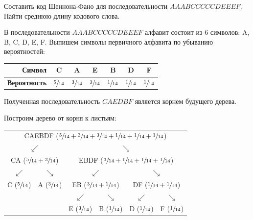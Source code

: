 \begin{example}
    \task%
    Составить код Шеннона-Фано для последовательности $AAABCCCCCDEEEF$. Найти среднюю длину кодового слова.

    \solution%
    В последовательности $AAABCCCCCDEEEF$ алфавит состоит из 6 символов: A, B, C, D, E, F. Выпишем символы первичного алфавита по убыванию вероятностей:
    \begin{table}[H]
        \centering
        \begin{tabular}{|r|c|c|c|c|c|c|}
            \hline
            \textbf{Символ} & C & A & E & B & D & F \\ \hline
            \textbf{Вероятность} & $\sfrac{5}{14}$ & $\sfrac{3}{14}$ & $\sfrac{3}{14}$ & $\sfrac{1}{14}$ & $\sfrac{1}{14}$ & $\sfrac{1}{14}$ \\ \hline
        \end{tabular}
    \end{table}

    Полученная последовательность $CAEDBF$ является корнем будущего дерева.

    Построим дерево от корня к листьям:

    \begin{table}[H]
        \centering
        \begin{tabular}{cccccc}
            \multicolumn{6}{c}{CAEBDF ($\sfrac{5}{14} + \sfrac{3}{14} + \sfrac{3}{14} + \sfrac{1}{14} + \sfrac{1}{14} + \sfrac{1}{14}$)} \\
            \multicolumn{2}{c}{$\swarrow$} & \multicolumn{4}{c}{$\searrow$} \\
            \multicolumn{2}{c}{CA ($\sfrac{5}{14} + \sfrac{3}{14}$)} & \multicolumn{4}{c}{EBDF ($\sfrac{3}{14} + \sfrac{1}{14} + \sfrac{1}{14} + \sfrac{1}{14}$)} \\
            $\swarrow$ & $\searrow$ & \multicolumn{2}{c}{$\swarrow$} & \multicolumn{2}{c}{$\searrow$} \\
            C ($\sfrac{5}{14}$) & A ($\sfrac{3}{14}$) & \multicolumn{2}{c}{EB ($\sfrac{3}{14} + \sfrac{1}{14}$)} & \multicolumn{2}{c}{DF ($\sfrac{1}{14} + \sfrac{1}{14}$)} \\
            & & $\swarrow$ & $\searrow$ & $\swarrow$ & $\searrow$ \\
            & & E ($\sfrac{3}{14}$) & B ($\sfrac{1}{14}$) & D ($\sfrac{1}{14}$) & F ($\sfrac{1}{14}$) \\
        \end{tabular}
    \end{table}


\end{example}
